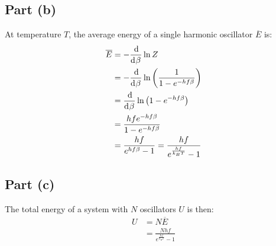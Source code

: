 \documentclass{article}
\begin{document}
\subsection*{Part (b)}
At temperature $T$, the average energy of a single harmonic oscillator $\overline{E}$ is:
\begin{equation}
    \begin{split}
        \overline{E} & = -\deriv{}{\beta} \ln{Z} \\
        & = -\deriv{}{\beta} \ln{\left(\frac{1}{1 - e^{-hf\beta}}\right)} \\
        & = \deriv{}{\beta} \ln{\left(1 - e^{-hf\beta}\right)} \\
        & = \frac{hfe^{-hf\beta}}{1 - e^{-hf\beta}} \\
        & = \frac{hf}{e^{hf\beta} - 1} = \frac{hf}{e^{\frac{hf}{k_BT}} - 1} \\
    \end{split}
\end{equation}
\subsection*{Part (c)}
The total energy of a system with $N$ oscillators $U$ is then:
\begin{equation}
    \begin{split}
        U & = N\overline{E} \\
        & = \frac{Nhf}{e^{\frac{hf}{k_BT}} - 1}
    \end{split}
\end{equation}
\end{document}
